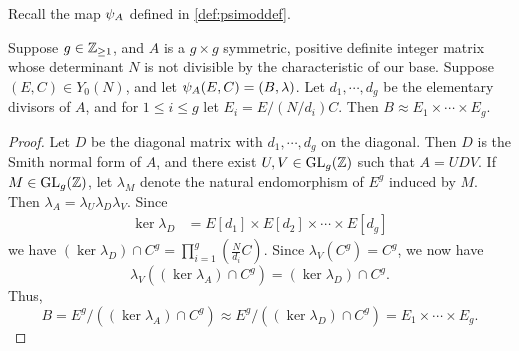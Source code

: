 \documentclass{amsart}
\begin{document}
Recall the map $\psi_{A}$ defined in \eqref{def:psimoddef}.

\begin{lemma}\label{lem:psimod-weakly-isomorphic-to-product}
Suppose $g\in\mathbb{Z}_{\ge 1}$, and $A$ is a $g \times g$ symmetric, positive definite integer matrix whose determinant $N$ is not divisible by the characteristic of our base. %
Suppose $(E,C) \in Y_0(N)$, and let $\psi_{A}(E,C) = (B,\lambda)$.  Let $d_1, \cdots, d_g$ be the elementary divisors of $A$, and for $1 \le i \le g$ let $E_i = E/(N/d_i)C$. Then
$
    B \approx E_1 \times \cdots \times E_g.
$
\end{lemma}

\begin{proof}
  Let $D$ be the diagonal matrix with $d_1, \cdots, d_g$ on the diagonal.
Then $D$ is the Smith normal form of $A$, and there exist $U,V \in \operatorname{GL}_g(\mathbb{Z})$ such that $A = UDV$.
If $M \in \operatorname{GL}_g(\mathbb{Z})$, let $\lambda_M$ denote the natural endomorphism of $E^g$ induced by $M$.
Then %
$\lambda_A = \lambda_U \lambda_D \lambda_V$. Since
  \begin{align*}
    \ker \lambda_D &= E[d_1] \times E[d_2] \times \cdots \times E[d_g]
  \end{align*}
  we have $(\ker \lambda_D) \cap C^g = \prod_{i=1}^g (\frac{N}{d_i}C)$. 
 Since $\lambda_V(C^g) = C^g$, we now have
  \[
    \lambda_V((\ker \lambda_A) \cap C^g) = (\ker \lambda_D) \cap C^g.
  \]
  Thus,
  $$
  B = E^g/((\ker \lambda_A) \cap C^g) \approx E^g/((\ker \lambda_D) \cap C^g) = E_1 \times \cdots \times E_g.
  $$
\end{proof}
\end{document}

